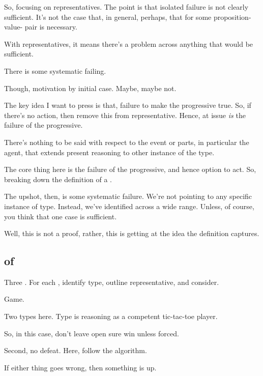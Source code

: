\begin{note}
  \color{red}
  So, focusing on representatives.
  The point is that isolated failure is not clearly sufficient.
  It's not the case that, in general, perhaps, that \pevent{} for some proposition-value-\poP{} pair is necessary.

  With representatives, it means there's a problem across anything that would be sufficient.

  There is some systematic failing.

  Though, motivation by initial case.
  Maybe, maybe not.

  The key idea I want to press is that, failure to make the progressive true.
  So, if there's no action, then remove this from representative.
  Hence, at issue \emph{is} the failure of the progressive.

  There's nothing to be said with respect to the event or parts, in particular the agent, that extends present reasoning to other instance of the type.

  The core thing here is the failure of the progressive, and hence option to act.
  So, breaking down the definition of a \pevent{}.
\end{note}

\begin{note}
  The upshot, then, is some systematic failure.
  We're not pointing to any specific instance of type.
  Instead, we've identified across a wide range.
  Unless, of course, you think that one case is sufficient.
\end{note}

\begin{note}
  Well, this is not a proof, rather, this is getting at the idea the definition captures.
\end{note}

\subsection{ of \tR{}}
\label{sec:illu3}

\begin{note}
  Three .
  For each , identify type, outline representative, and consider.
\end{note}


\begin{note}
  \begin{illustration}
    Game.
  \end{illustration}

  Two types here.
  Type is reasoning as a competent tic-tac-toe player.

  So, in this case, don't leave open sure win unless forced.

  Second, no defeat.
  Here, follow the algorithm.

  If either thing goes wrong, then something is up.
\end{note}

